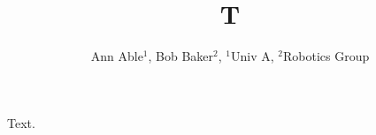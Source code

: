 \documentclass{article}
\begin{document}
\title{T}
\author{Ann Able$^1$, Bob Baker$^2$, $^1$Univ A, $^2$Robotics Group}
\maketitle
Text.
\end{document}
